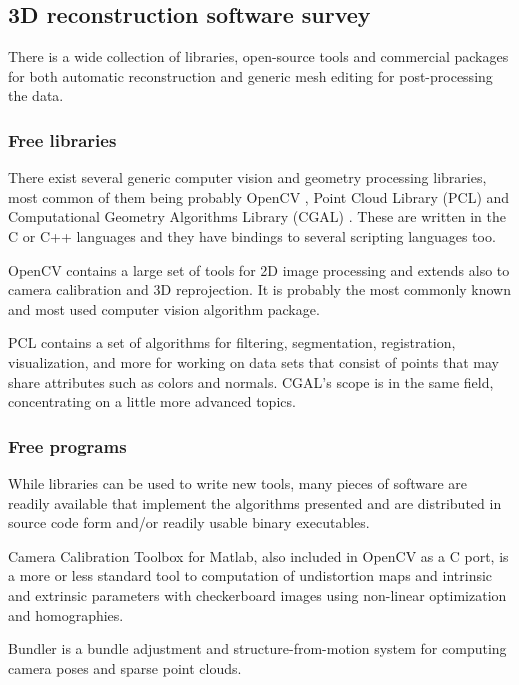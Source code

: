 \subsection{3D reconstruction software survey} %

 There is a wide collection of libraries, open-source tools and commercial packages for both automatic reconstruction and generic mesh editing for post-processing the data.

\subsubsection{Free libraries} %

There exist several generic computer vision and geometry processing libraries, most common of them being probably OpenCV \cite{opencv}, Point Cloud Library (PCL) \cite{pcl} and Computational Geometry Algorithms Library (CGAL) \cite{cgal}. These are written in the C or C++ languages and they have bindings to several scripting languages too.

OpenCV contains a large set of tools for 2D image processing and extends also to camera calibration and 3D reprojection.
It is probably the most commonly known and most used computer vision algorithm package.

PCL contains a set of algorithms for filtering, segmentation, registration, visualization, and more for working on data sets that consist of points that may share attributes such as colors and normals. CGAL's scope is in the same field, concentrating on a little more advanced topics.


\subsubsection{Free programs} %

While libraries can be used to write new tools, many pieces of software are readily available that implement the algorithms presented and are distributed in source code form and/or readily usable binary executables.

Camera Calibration Toolbox for Matlab, also included in OpenCV as a C port, is a more or less standard tool to computation of undistortion maps and intrinsic and extrinsic parameters with checkerboard images using non-linear optimization and homographies. \cite{camcalmatlab}

Bundler is a bundle adjustment and structure-from-motion system for computing camera poses and sparse point clouds. \cite{snavely2006photo}

